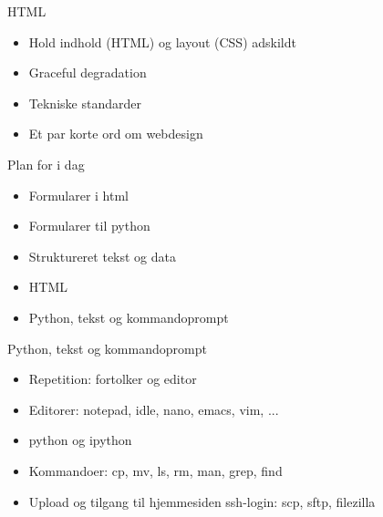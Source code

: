 \documentclass[a4paper,landscape]{slides}
\begin{document}
\begin{slide}
	\begin{center} {\large 
            HTML 
	} \end{center}
	\begin{itemize} \addtolength{\itemsep}{-\baselineskip}
		\item Hold indhold (HTML) og layout (CSS) adskildt 
		\item Graceful degradation
		\item Tekniske standarder
                \item Et par korte ord om webdesign
	\end{itemize}
\end{slide}

\begin{slide}
	\begin{center} {\large 
            Plan for i dag
	} \end{center}
	\begin{itemize} \addtolength{\itemsep}{-\baselineskip}
		\item Formularer i html
		\item Formularer til python
		\item Struktureret tekst og data
		\item HTML
		\item Python, tekst og kommandoprompt
	\end{itemize}
\end{slide}


\begin{slide}
	\begin{center} {\large 
            Python, tekst og kommandoprompt
	} \end{center}
	\begin{itemize} \addtolength{\itemsep}{-\baselineskip}
                \item Repetition: fortolker og editor
                \item Editorer: notepad, idle, nano, emacs, vim, ...
                \item python og ipython
                \item Kommandoer: cp, mv, ls, rm, man, grep, find
                \item Upload og tilgang til hjemmesiden ssh-login: scp, sftp, filezilla
	\end{itemize}
\end{slide}
\end{document}
